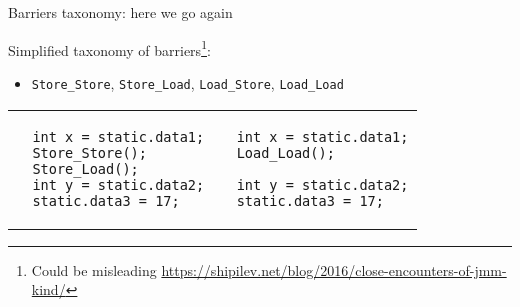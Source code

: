 \begin{frame}[t, fragile]{Barriers taxonomy: here we go again}

Simplified taxonomy of barriers\footnote{\tiny Could be misleading \url{https://shipilev.net/blog/2016/close-encounters-of-jmm-kind/}}:
\begin{itemize}
    \item \texttt{Store\_Store}, \texttt{Store\_Load}, \texttt{Load\_Store}, \texttt{Load\_Load}
\end{itemize}

\begin{tabular}{p{8cm}p{5cm}}

\begin{verbatim}
  int x = static.data1;
  Store_Store();
  Store_Load();
  int y = static.data2;
  static.data3 = 17;
\end{verbatim}

 &

 \begin{verbatim}
  int x = static.data1;
  Load_Load();

  int y = static.data2;
  static.data3 = 17;
\end{verbatim}

\end{tabular}
\end{frame}



